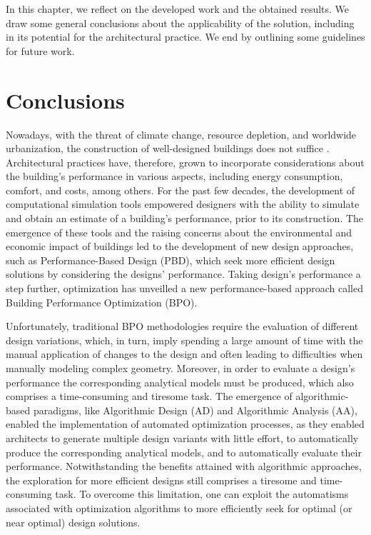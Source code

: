 \label{chap:conclusion}

In this chapter, we reflect on the developed work and the obtained results. We draw some general conclusions about the applicability of the solution, including in its potential for the architectural practice. We end by outlining some guidelines for future work. 

\section{Conclusions}

Nowadays, with the threat of climate change, resource depletion, and worldwide urbanization, the construction of well-designed buildings does not suffice \cite{Wortmann2015AdvSBO}. Architectural practices have, therefore, grown to incorporate considerations about the building's performance in various aspects, including energy consumption, comfort, and costs, among others. For the past few decades, the development of computational simulation tools empowered designers with the ability to simulate and obtain an estimate of a building’s performance, prior to its construction. The emergence of these tools and the raising concerns about the environmental and economic impact of buildings led to the development of new design approaches, such as Performance-Based Design (PBD), which seek more efficient design solutions by considering the designs’ performance. Taking design’s performance a step further, optimization has unveilled a new performance-based approach called Building Performance Optimization (BPO). 

Unfortunately, traditional \ac{BPO} methodologies require the evaluation of different design variations, which, in turn, imply spending a large amount of time with the manual application of changes to the design and often leading to difficulties when manually modeling complex geometry. Moreover, in order to evaluate a design's performance the corresponding analytical models must be produced, which also comprises a time-consuming and tiresome task. The emergence of algorithmic-based paradigms, like Algorithmic Design (\ac{AD}) and Algorithmic Analysis (\ac{AA}), enabled the implementation of automated optimization processes, as they enabled architects to generate multiple design variants with little effort, to automatically produce the corresponding analytical models, and to automatically evaluate their performance. Notwithstanding the benefits attained with algorithmic approaches, the exploration for more efficient designs still comprises a tiresome and time-consuming task. To overcome this limitation, one can exploit the automatisms associated with optimization algorithms to more efficiently seek for optimal (or near optimal) design solutions.

